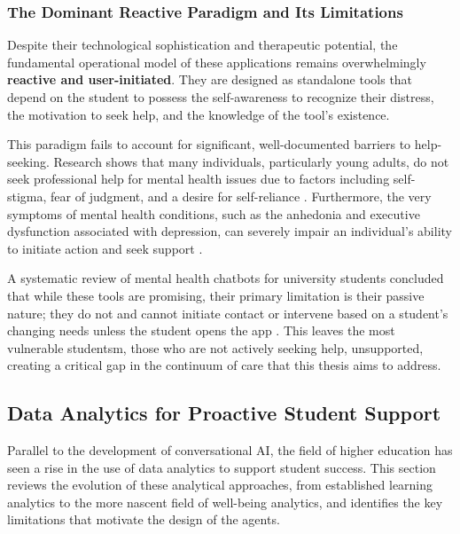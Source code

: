 \subsubsection{The Dominant Reactive Paradigm and Its Limitations}
Despite their technological sophistication and therapeutic potential, the fundamental operational model of these applications remains overwhelmingly \textbf{reactive and user-initiated}. They are designed as standalone tools that depend on the student to possess the self-awareness to recognize their distress, the motivation to seek help, and the knowledge of the tool's existence.

This paradigm fails to account for significant, well-documented barriers to help-seeking. Research shows that many individuals, particularly young adults, do not seek professional help for mental health issues due to factors including self-stigma, fear of judgment, and a desire for self-reliance \cite{corrigan2009stigmahelpseeking,patel2022helpseekingcollege}. Furthermore, the very symptoms of mental health conditions, such as the anhedonia and executive dysfunction associated with depression, can severely impair an individual's ability to initiate action and seek support \cite{liu2023distresshelpseeking}.

A systematic review of mental health chatbots for university students concluded that while these tools are promising, their primary limitation is their passive nature; they do not and cannot initiate contact or intervene based on a student's changing needs unless the student opens the app \cite{adhikari2023chatbotsreview}. This leaves the most vulnerable studentsm, those who are not actively seeking help, unsupported, creating a critical gap in the continuum of care that this thesis aims to address.


\subsection{Data Analytics for Proactive Student Support}

Parallel to the development of conversational AI, the field of higher education has seen a rise in the use of data analytics to support student success. This section reviews the evolution of these analytical approaches, from established learning analytics to the more nascent field of well-being analytics, and identifies the key limitations that motivate the design of the agents.

